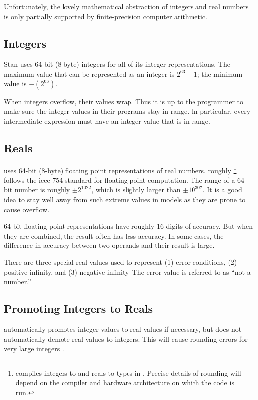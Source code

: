 Unfortunately, the lovely mathematical abstraction of integers and
real numbers is only partially supported by finite-precision computer
arithmetic.  

\subsection{Integers}\label{int-data-type.section}

Stan uses 64-bit (8-byte) integers for all of its integer
representations.  The maximum value that can be represented
as an integer is $2^{63}-1$; the minimum value is $-(2^{63})$.

When integers overflow, their values wrap.  Thus it is up to
the \Stan programmer to make sure the integer values in their programs
stay in range.  In particular, every intermediate expression must have
an integer value that is in range.

\subsection{Reals}\label{real-data-type.section}

\Stan uses 64-bit (8-byte) floating point representations of real
numbers.  \Stan roughly%
%
\footnote{\Stan compiles integers to  and reals to
   types in \Cpp.  Precise details of rounding will depend
  on the compiler and hardware architecture on which the code is run.}
%
follows the {\sc ieee} 754 standard for floating-point computation.
The range of a 64-bit number is roughly $\pm 2^{1022}$, which is
slightly larger than $\pm 10^{307}$.  It is a good idea to stay well
away from such extreme values in \Stan models as they are prone to
cause overflow.

64-bit floating point representations have roughly 16 digits of
accuracy.  But when they are combined, the result often has less
accuracy.  In some cases, the difference in accuracy between two
operands and their result is large.  

There are three special real values used to represent (1) error
conditions, (2) positive infinity, and (3) negative infinity.  The
error value is referred to as ``not a number.''

\subsection{Promoting Integers to Reals}

\Stan automatically promotes integer values to real values if
necessary, but does not automatically demote real values to integers.
This will cause rounding errors for very large integers .

